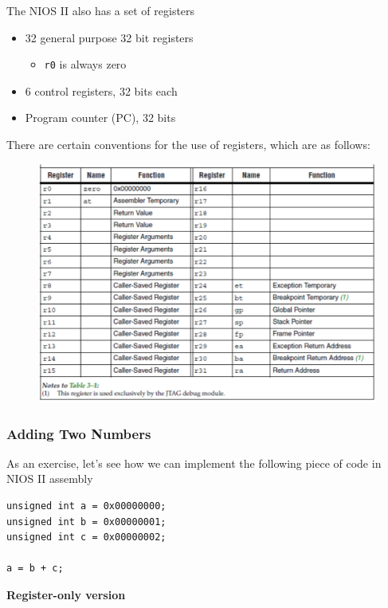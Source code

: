 \documentclass[10pt]{article}
\begin{document}
The NIOS II also has a set of registers

\begin{itemize}
	\item 32 general purpose 32 bit registers
		\begin{itemize}
			\item \texttt{r0} is always zero
		\end{itemize}
	\item 6 control registers, 32 bits each
	\item Program counter (PC), 32 bits
\end{itemize}

There are certain conventions for the use of registers, which are as follows:
\begin{figure}[H]
	\centering
	\includegraphics[width=0.8\linewidth]{img/image_2022-09-16-17-17-34.png}
\end{figure}

\subsubsection{Adding Two Numbers}
As an exercise, let's see how we can implement the following piece of code in NIOS II assembly

\begin{listing}[H]
\begin{verbatim}
unsigned int a = 0x00000000;
unsigned int b = 0x00000001;
unsigned int c = 0x00000002;

a = b + c;
\end{verbatim}
\end{listing}


\textbf{Register-only version} 
\end{document}
